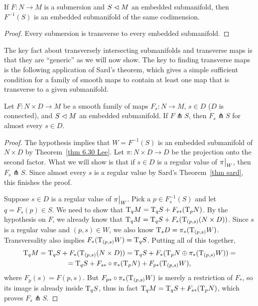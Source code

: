 \begin{cor}
    If $F:N\to M$ is a submersion and $S\vartriangleleft M$ an embedded submanifold, then $F^{-1}(S)$ is an embedded submanifold of the same codimension.
\end{cor}
\begin{proof}
    Every submersion is transverse to every embedded submanifold.
\end{proof}

The key fact about transversely intersecting submanifolds and transverse maps is that they are ``generic'' as we will now show. The key to finding transverse maps is the
following application of Sard's theorem, which gives a simple sufficient condition for
a family of smooth maps to contain at least one map that is transverse to a given submanifold.

\begin{thm}\label{thm 6.35 Lee}
    Let $F:N\times D\to M$ be a smooth family of maps $F_s:N\to M$, $s\in D$ ($D$ is connected), and $S\vartriangleleft M$ an embedded submanifold. If $F \pitchfork S$, then $F_s\pitchfork S$ for almost every $s\in D$.
\end{thm}
\begin{proof}
    The hypothesis implies that $W=F^{-1}(S)$ is an embedded submanifold of $N\times D$ by Theorem~\ref{thm 6.30 Lee}. Let $\pi:N\times D\to D$ be the projection onto the second factor. What we will show is that if $s\in D$ is a regular value of $\restr{\pi}{W}$, then $F_s\pitchfork S$. Since almost every $s$ is a regular value by Sard's Theorem~\ref{thm sard}, this finishes the proof.

    Suppose $s\in D$ is a regular value of $\restr{\pi}{W}$. Pick a $p\in F_s^{-1}(S)$ and let $q=F_s(p)\in S$. We need to show that $\mathrm{T}_qM=\mathrm{T}_qS+F_{s\ast}(\mathrm{T}_pN)$. By the hypothesis on $F$, we already know that $\mathrm{T}_qM=\mathrm{T}_qS+F_\ast(\mathrm{T}_{(p,s)}(N\times D))$. Since $s$ is a regular value and $(p,s)\in W$, we also know $\mathrm{T}_sD=\pi_\ast(\mathrm{T}_{(p,s)}W)$. Transversality also implies $F_\ast(\mathrm{T}_{(p,s)}W)=\mathrm{T}_qS$. Putting all of this together,
    \begin{multline}
        \mathrm{T}_qM=\mathrm{T}_qS+F_\ast(\mathrm{T}_{(p,s)}(N\times D))=\mathrm{T}_qS+F_\ast(\mathrm{T}_pN\oplus \pi_\ast(\mathrm{T}_{(p,s)}W))=\\=\mathrm{T}_qS+F_{s\ast}\circ\pi_\ast(\mathrm{T}_pN)+F_{p\ast}(\mathrm{T}_{(p,s)}W),
    \end{multline}
    where $F_p(s)=F(p,s)$. But $F_{p\ast}\circ\pi_\ast(\mathrm{T}_{(p,s)}W)$ is merely a restriction of $F_\ast$, so its image is already inside $\mathrm{T}_qS$, thus in fact $\mathrm{T}_qM=\mathrm{T}_qS+F_{s\ast}(\mathrm{T}_pN)$, which proves $F_s\pitchfork S$.
\end{proof}



